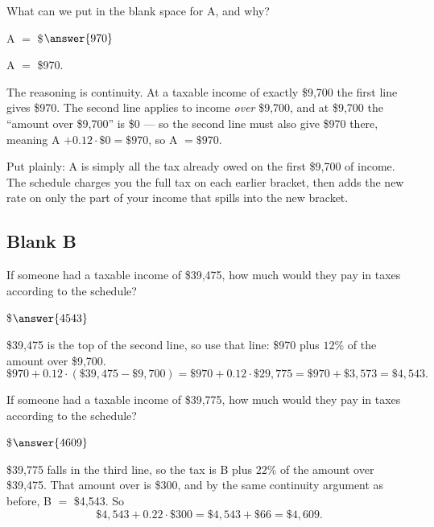 \documentclass[12pt]{ximera}
\begin{document}
\begin{problem}
What can we put in the blank space for A, and why?

A $=$ \$$\answer{970}$

\begin{freeResponse}
\end{freeResponse}

\begin{solution}
A $=$ \$970.

The reasoning is continuity. At a taxable income of exactly \$9,700 the first line gives
\$970. The second line applies to income \emph{over} \$9,700, and at \$9,700 the ``amount
over \$9,700'' is \$0 --- so the second line must also give \$970 there, meaning
A $+ 0.12 \cdot \$0 = \$970$, so A $= \$970$.

Put plainly: A is simply all the tax already owed on the first \$9,700 of income. The
schedule charges you the full tax on each earlier bracket, then adds the new rate on
only the part of your income that spills into the new bracket.
\end{solution}
\end{problem}

\subsection*{Blank B}

\begin{problem}
If someone had a taxable income of \$39,475, how much would they pay in taxes according
to the schedule?

\$$\answer{4543}$

\begin{solution}
\$39,475 is the top of the second line, so use that line: \$970 plus $12\%$ of the
amount over \$9,700.
\[
\$970 + 0.12 \cdot (\$39{,}475 - \$9{,}700) = \$970 + 0.12 \cdot \$29{,}775
= \$970 + \$3{,}573 = \$4{,}543.
\]
\end{solution}
\end{problem}

\begin{problem}
If someone had a taxable income of \$39,775, how much would they pay in taxes according
to the schedule?

\$$\answer{4609}$

\begin{solution}
\$39,775 falls in the third line, so the tax is B plus $22\%$ of the amount over
\$39,475. That amount over is \$300, and by the same continuity argument as before,
B $=$ \$4,543. So
\[
\$4{,}543 + 0.22 \cdot \$300 = \$4{,}543 + \$66 = \$4{,}609.
\]
\end{solution}
\end{problem}
\end{document}

